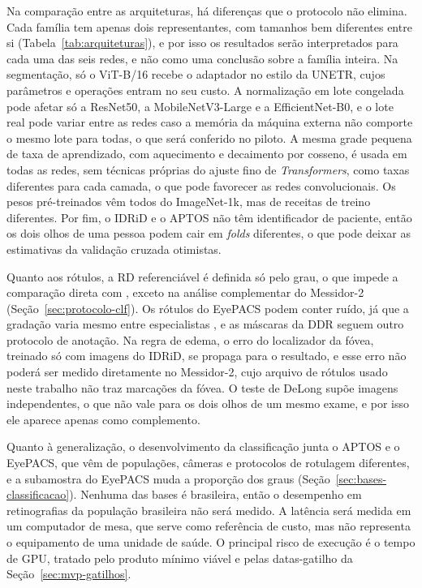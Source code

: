 Na comparação entre as arquiteturas, há diferenças que o protocolo não elimina. Cada família tem apenas dois representantes, com tamanhos bem diferentes entre si (Tabela~\ref{tab:arquiteturas}), e por isso os resultados serão interpretados para cada uma das seis redes, e não como uma conclusão sobre a família inteira. Na segmentação, só o ViT-B/16 recebe o adaptador no estilo da UNETR, cujos parâmetros e operações entram no seu custo. A normalização em lote congelada pode afetar só a ResNet50, a MobileNetV3-Large e a EfficientNet-B0, e o lote real pode variar entre as redes caso a memória da máquina externa não comporte o mesmo lote para todas, o que será conferido no piloto. A mesma grade pequena de taxa de aprendizado, com aquecimento e decaimento por cosseno, é usada em todas as redes, sem técnicas próprias do ajuste fino de \textit{Transformers}, como taxas diferentes para cada camada, o que pode favorecer as redes convolucionais. Os pesos pré-treinados vêm todos do ImageNet-1k, mas de receitas de treino diferentes. Por fim, o IDRiD e o APTOS não têm identificador de paciente, então os dois olhos de uma pessoa podem cair em \textit{folds} diferentes, o que pode deixar as estimativas da validação cruzada otimistas.

Quanto aos rótulos, a RD referenciável é definida só pelo grau, o que impede a comparação direta com , exceto na análise complementar do Messidor-2 (Seção~\ref{sec:protocolo-clf}). Os rótulos do EyePACS podem conter ruído, já que a gradação varia mesmo entre especialistas \cite{krause2018grader}, e as máscaras da DDR seguem outro protocolo de anotação. Na regra de edema, o erro do localizador da fóvea, treinado só com imagens do IDRiD, se propaga para o resultado, e esse erro não poderá ser medido diretamente no Messidor-2, cujo arquivo de rótulos usado neste trabalho não traz marcações da fóvea. O teste de DeLong supõe imagens independentes, o que não vale para os dois olhos de um mesmo exame, e por isso ele aparece apenas como complemento.

Quanto à generalização, o desenvolvimento da classificação junta o APTOS e o EyePACS, que vêm de populações, câmeras e protocolos de rotulagem diferentes, e a subamostra do EyePACS muda a proporção dos graus (Seção~\ref{sec:bases-classificacao}). Nenhuma das bases é brasileira, então o desempenho em retinografias da população brasileira não será medido. A latência será medida em um computador de mesa, que serve como referência de custo, mas não representa o equipamento de uma unidade de saúde. O principal risco de execução é o tempo de GPU, tratado pelo produto mínimo viável e pelas datas-gatilho da Seção~\ref{sec:mvp-gatilhos}.
